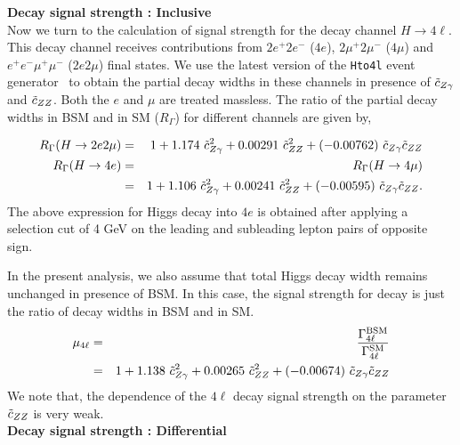 {\bf Decay signal strength : Inclusive} \\


Now we turn to the calculation of signal strength for the decay channel $H \to 4\ell$. This decay 
channel receives contributions from $2e^+2e^-$ ($4e$), $2\mu^+ 2\mu^-$ ($4\mu$) and $e^+e^-\mu^+\mu^-$ ($2e2\mu$) final states.
We use the latest version of the {\tt Hto4l} event generator~\cite{Boselli:2017pef} to obtain the partial decay widths in these 
channels in presence of $\tilde c_{Z\gamma}$ and $\tilde c_{ZZ}$. Both the $e$ and $\mu$ are treated massless. The ratio of the partial decay widths in BSM and in SM ($R_\Gamma$) for different channels are given by, 

{
\begin{eqnarray}
 R_{\Gamma}(H \to 2e2\mu) &=& 1  + 1.174~ \tilde c_{Z\gamma}^2 + 0.00291~ \tilde c_{ZZ}^2  
   + (-0.00762)~\tilde c_{Z\gamma}\tilde c_{ZZ} \\
 R_{\Gamma}(H \to 4e) 
 &=& R_{\Gamma}(H \to 4\mu) \nonumber \\
 &=& 1  + 1.106~ \tilde c_{Z\gamma}^2 + 0.00241~ \tilde c_{ZZ}^2 
   + (-0.00595)~\tilde c_{Z\gamma}\tilde c_{ZZ}.
\end{eqnarray}
}
The above expression for Higgs decay 
into $4e$ is obtained after applying a selection cut of { 4 GeV} on the leading and subleading lepton pairs 
of opposite sign.

In the present analysis, we also assume that total Higgs decay width remains unchanged in presence of BSM. In this
case, the signal strength for decay is just the ratio of decay widths in BSM and in SM.
{
\begin{eqnarray}\label{eq:mu4l}
 \mu_{4\ell} &=& \frac{\Gamma^{\rm BSM}_{4\ell}}{\Gamma^{\rm SM}_{4\ell}}  \nonumber \\
 &=& 1  + 1.138~ \tilde c_{Z\gamma}^2 + 
 0.00265~ \tilde c_{ZZ}^2  +
 (-0.00674)~ \tilde c_{Z\gamma} \tilde c_{ZZ} 
\end{eqnarray}
}
We note that, the dependence of the $4\ell$ decay signal strength on the parameter $\tilde c_{ZZ}$ is very weak. \\

{\bf Decay signal strength : Differential} \\

